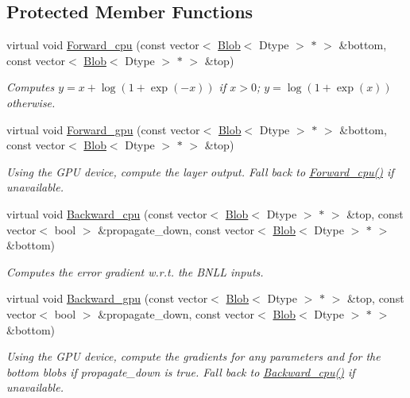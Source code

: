 \subsection*{Protected Member Functions}
\begin{DoxyCompactItemize}
\item 
virtual void \hyperlink{classcaffe_1_1BNLLLayer_a6a3458c972d30459aaa46bae3d331ceb}{Forward\+\_\+cpu} (const vector$<$ \hyperlink{classcaffe_1_1Blob}{Blob}$<$ Dtype $>$ $\ast$ $>$ \&bottom, const vector$<$ \hyperlink{classcaffe_1_1Blob}{Blob}$<$ Dtype $>$ $\ast$ $>$ \&top)
\begin{DoxyCompactList}\small\item\em Computes $ y = x + \log(1 + \exp(-x)) $ if $ x > 0 $; $ y = \log(1 + \exp(x)) $ otherwise. \end{DoxyCompactList}\item 
virtual void \hyperlink{classcaffe_1_1BNLLLayer_ab21bef6df27bee7d7579d02c18d8dfb0}{Forward\+\_\+gpu} (const vector$<$ \hyperlink{classcaffe_1_1Blob}{Blob}$<$ Dtype $>$ $\ast$ $>$ \&bottom, const vector$<$ \hyperlink{classcaffe_1_1Blob}{Blob}$<$ Dtype $>$ $\ast$ $>$ \&top)\hypertarget{classcaffe_1_1BNLLLayer_ab21bef6df27bee7d7579d02c18d8dfb0}{}\label{classcaffe_1_1BNLLLayer_ab21bef6df27bee7d7579d02c18d8dfb0}

\begin{DoxyCompactList}\small\item\em Using the G\+PU device, compute the layer output. Fall back to \hyperlink{classcaffe_1_1BNLLLayer_a6a3458c972d30459aaa46bae3d331ceb}{Forward\+\_\+cpu()} if unavailable. \end{DoxyCompactList}\item 
virtual void \hyperlink{classcaffe_1_1BNLLLayer_ab76de68096d3ad4a1ac57ea3dc96f4d1}{Backward\+\_\+cpu} (const vector$<$ \hyperlink{classcaffe_1_1Blob}{Blob}$<$ Dtype $>$ $\ast$ $>$ \&top, const vector$<$ bool $>$ \&propagate\+\_\+down, const vector$<$ \hyperlink{classcaffe_1_1Blob}{Blob}$<$ Dtype $>$ $\ast$ $>$ \&bottom)
\begin{DoxyCompactList}\small\item\em Computes the error gradient w.\+r.\+t. the B\+N\+LL inputs. \end{DoxyCompactList}\item 
virtual void \hyperlink{classcaffe_1_1BNLLLayer_ae85a771b875a4acf2c8b72e51f2da1eb}{Backward\+\_\+gpu} (const vector$<$ \hyperlink{classcaffe_1_1Blob}{Blob}$<$ Dtype $>$ $\ast$ $>$ \&top, const vector$<$ bool $>$ \&propagate\+\_\+down, const vector$<$ \hyperlink{classcaffe_1_1Blob}{Blob}$<$ Dtype $>$ $\ast$ $>$ \&bottom)\hypertarget{classcaffe_1_1BNLLLayer_ae85a771b875a4acf2c8b72e51f2da1eb}{}\label{classcaffe_1_1BNLLLayer_ae85a771b875a4acf2c8b72e51f2da1eb}

\begin{DoxyCompactList}\small\item\em Using the G\+PU device, compute the gradients for any parameters and for the bottom blobs if propagate\+\_\+down is true. Fall back to \hyperlink{classcaffe_1_1BNLLLayer_ab76de68096d3ad4a1ac57ea3dc96f4d1}{Backward\+\_\+cpu()} if unavailable. \end{DoxyCompactList}\end{DoxyCompactItemize}

